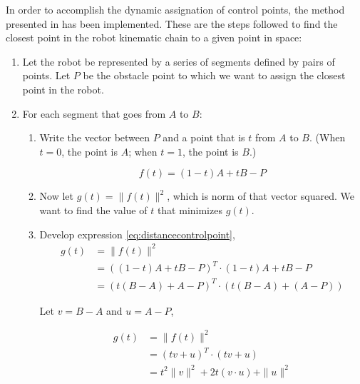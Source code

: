 In order to accomplish the dynamic assignation of control points, the method presented in \cite{stackexchangeSegment} has been implemented. These are the steps followed to find the closest point in the robot kinematic chain to a given point in space:

\begin{enumerate}
    \item Let the robot be represented by a series of segments defined by pairs of points. Let $P$ be the obstacle point to which we want to assign the closest point in the robot.

    \item For each segment that goes from $A$ to $B$:

    \begin{enumerate}
        \item Write the vector between $P$ and a point that is $t$ from $A$ to $B$. (When $t = 0$, the point is $A$; when $t = 1$, the point is $B$.)


        \begin{equation}
            \label{eq:distancecontrolpoint}
            f(t) = (1-t)A + t B  - P
        \end{equation}

        \item Now let $g(t) = \| f(t) \|^2$, which is norm of that vector squared. We want to find the value of $t$ that minimizes $g(t)$.
        \item Develop expression \ref{eq:distancecontrolpoint},
        \begin{equation*}
            \begin{split}
            g(t) & = \|f(t)\|^2 \\
            &= ((1-t)A + t B  - P)^T \cdot (1-t)A + t B  - P \\
            &= (t (B-A) + A-P)^T \cdot (t (B-A) + (A-P))
            \end{split}
        \end{equation*}

        Let $v = B-A$ and $u = A - P$,


        \begin{equation*}
            \begin{split}
            g(t) & = \|f(t)\|^2 \\
            &= (t v + u)^T \cdot (t v + u)\\
            &= t^2 \|v\|^2  + 2t (v \cdot u) + \|u\|^2
            \end{split}
        \end{equation*}


\end{enumerate}
\end{enumerate}
